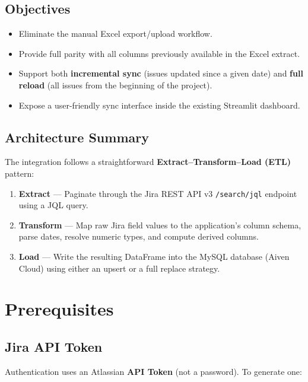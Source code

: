 \documentclass[12pt, a4paper]{article}
\begin{document}
\subsection{Objectives}

\begin{itemize}
    \item Eliminate the manual Excel export/upload workflow.
    \item Provide full parity with all columns previously available in the Excel extract.
    \item Support both \textbf{incremental sync} (issues updated since a given date) and
          \textbf{full reload} (all issues from the beginning of the project).
    \item Expose a user-friendly sync interface inside the existing Streamlit dashboard.
\end{itemize}

\subsection{Architecture Summary}

The integration follows a straightforward \textbf{Extract–Transform–Load (ETL)} pattern:

\begin{enumerate}
    \item \textbf{Extract} — Paginate through the Jira REST API v3 \texttt{/search/jql}
          endpoint using a JQL query.
    \item \textbf{Transform} — Map raw Jira field values to the application's column schema,
          parse dates, resolve numeric types, and compute derived columns.
    \item \textbf{Load} — Write the resulting DataFrame into the MySQL database (Aiven Cloud)
          using either an upsert or a full replace strategy.
\end{enumerate}

\section{Prerequisites}

\subsection{Jira API Token}

Authentication uses an Atlassian \textbf{API Token} (not a password). To generate one:
\end{document}
